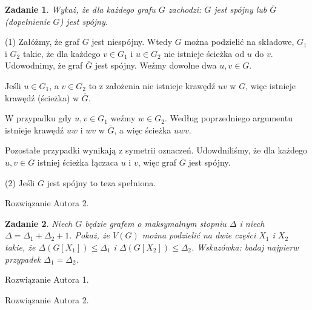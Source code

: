 \documentclass{mwart}
\newtheorem{zad}{Zadanie}[section]
\begin{document}
\begin{zad}
    Wykaż, że dla każdego grafu $G$ zachodzi: $G$ jest spójny lub $\bar{G}$ (dopełnienie $G$) jest spójny.
\end{zad}
\begin{mdframed}

     (1) Załóżmy, że graf $G$ jest niespójny. Wtedy $G$ można podzielić na 
     składowe, $G_1$ i $G_2$ takie, że dla każdego $v \in G_1$ i $u \in G_2$ 
     nie istnieje ścieżka od $u$ do $v$. Udowodnimy, że graf $\overline{G}$ jest 
     spójny. Weźmy dowolne dwa $u, v \in G$. 
     
         Jeśli $u \in G_1$, a $v \in G_2$ to 
     z założenia nie istnieje krawędź $uv$ w $G$, więc istnieje krawędź (ścieżka) w 
     $\overline{G}$. 
     
         W przypadku gdy $u, v \in G_1$ weźmy $w \in G_2$. Według poprzedniego 
     argumentu istnieje krawędź $uw$ i $wv$ w $\overline{G}$, a więc ścieżka $uwv$. 
     
         Pozostałe przypadki wynikają z symetrii oznaczeń. Udowdniliśmy, że dla każdego 
     $u, v \in \overline{G}$ istniej ścieżka łączaca $u$ i $v$, więc graf $\overline{G}$ 
     jest spójny.
 
     (2) Jeśli $G$ jest spójny to teza spełniona.
\end{mdframed}
\begin{mdframed}
    Rozwiązanie Autora 2.
\end{mdframed}


\begin{zad}
    Niech $G$ będzie grafem o maksymalnym stopniu $\Delta$ i niech $\Delta = \Delta_1 + \Delta_2 +1$.
    Pokaż, że $V(G)$ można podzielić na dwie części $X_1$ i $X_2$ takie, że $\Delta (G[X_1]) \leq \Delta_1$ i $\Delta (G[X_2]) \leq \Delta_2$.
    Wskazówka: badaj najpierw przypadek $\Delta_1 = \Delta_2$.
\end{zad}
\begin{mdframed}
    Rozwiązanie Autora 1.
\end{mdframed}
\begin{mdframed}
    Rozwiązanie Autora 2.
\end{mdframed}
\end{document}

